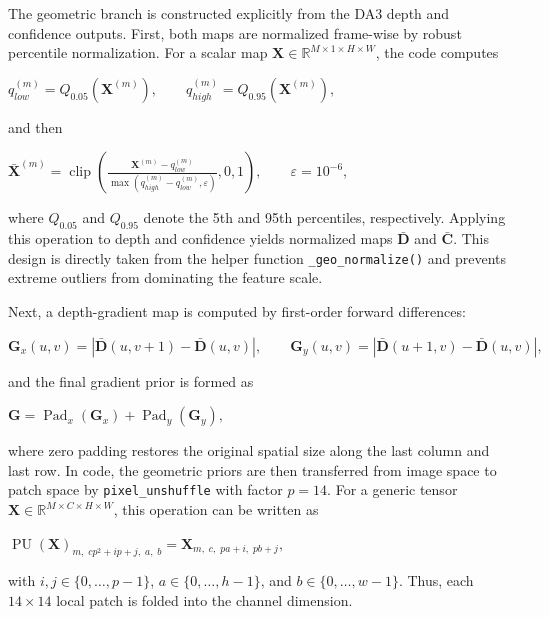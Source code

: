 The geometric branch is constructed explicitly from the DA3 depth and confidence outputs. First, both maps are normalized frame-wise by robust percentile normalization. For a scalar map $\mathbf{X}\in\mathbb{R}^{M\times 1\times H\times W}$, the code computes
\begin{center}
    $\displaystyle
    q_{low}^{(m)} = Q_{0.05}\!\left(\mathbf{X}^{(m)}\right), \qquad
    q_{high}^{(m)} = Q_{0.95}\!\left(\mathbf{X}^{(m)}\right),
    $
\end{center}
and then
\begin{center}
    $\displaystyle
    \bar{\mathbf{X}}^{(m)}
    =
    \operatorname{clip}
    \left(
    \frac{\mathbf{X}^{(m)} - q_{low}^{(m)}}
         {\max\!\left(q_{high}^{(m)} - q_{low}^{(m)}, \varepsilon\right)},
    0, 1
    \right),
    \qquad \varepsilon = 10^{-6},
    $
\end{center}
where $Q_{0.05}$ and $Q_{0.95}$ denote the 5th and 95th percentiles, respectively. Applying this operation to depth and confidence yields normalized maps $\bar{\mathbf{D}}$ and $\bar{\mathbf{C}}$. This design is directly taken from the helper function \texttt{\_geo\_normalize()} and prevents extreme outliers from dominating the feature scale.

Next, a depth-gradient map is computed by first-order forward differences:
\begin{center}
    $\displaystyle
    \mathbf{G}_x(u,v) = \left|\bar{\mathbf{D}}(u,v+1)-\bar{\mathbf{D}}(u,v)\right|,
    \qquad
    \mathbf{G}_y(u,v) = \left|\bar{\mathbf{D}}(u+1,v)-\bar{\mathbf{D}}(u,v)\right|,
    $
\end{center}
and the final gradient prior is formed as
\begin{center}
    $\displaystyle
    \mathbf{G} = \operatorname{Pad}_x(\mathbf{G}_x) + \operatorname{Pad}_y(\mathbf{G}_y),
    $
\end{center}
where zero padding restores the original spatial size along the last column and last row. In code, the geometric priors are then transferred from image space to patch space by \texttt{pixel\_unshuffle} with factor $p=14$. For a generic tensor $\mathbf{X}\in\mathbb{R}^{M\times C\times H\times W}$, this operation can be written as
\begin{center}
    $\displaystyle
    \operatorname{PU}(\mathbf{X})_{m,\;cp^2+ip+j,\;a,\;b}
    =
    \mathbf{X}_{m,\;c,\;pa+i,\;pb+j},
    $
\end{center}
with $i,j\in\{0,\dots,p-1\}$, $a\in\{0,\dots,h-1\}$, and $b\in\{0,\dots,w-1\}$. Thus, each $14\times 14$ local patch is folded into the channel dimension.

